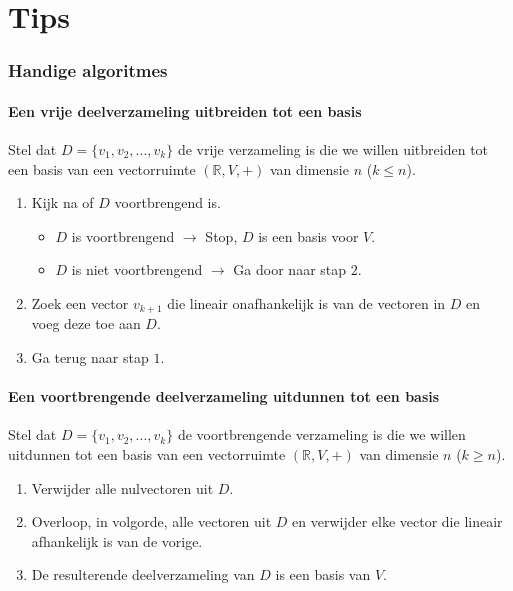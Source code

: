 \documentclass[lineaire_algebra_oplossingen.tex]{subfiles}
\begin{document}
\newpage
\part{Tips}


\section{Handige algoritmes}
\subsection{Een vrije deelverzameling uitbreiden tot een basis}
Stel dat $D = \{v_1,v_2,...,v_k\}$ de vrije verzameling is die we willen uitbreiden tot een basis van een vectorruimte $(\mathbb{R},V,+)$ van dimensie $n$ ($k\le n$).
\begin{enumerate}
\item Kijk na of $D$ voortbrengend is.
\begin{itemize}
\item $D$ is voortbrengend $\rightarrow$ Stop, $D$ is een  basis voor $V$.
\item $D$ is niet voortbrengend $\rightarrow$ Ga door naar stap $2$.
\end{itemize}
\item Zoek een vector $v_{k+1}$ die lineair onafhankelijk is van de vectoren in $D$ en voeg deze toe aan $D$.
\item Ga terug naar stap $1$.
\end{enumerate}
\subsection{Een voortbrengende deelverzameling uitdunnen tot een basis}
Stel dat $D = \{v_1,v_2,...,v_k\}$ de voortbrengende verzameling is die we willen uitdunnen tot een basis van een vectorruimte $(\mathbb{R},V,+)$ van dimensie $n$ ($k\ge n$).
\begin{enumerate}
\item Verwijder alle nulvectoren uit $D$.
\item Overloop, in volgorde, alle vectoren uit $D$ en verwijder elke vector die lineair afhankelijk is van de vorige.
\item De resulterende deelverzameling van $D$ is een basis van $V$.
\end{enumerate}
\end{document}
